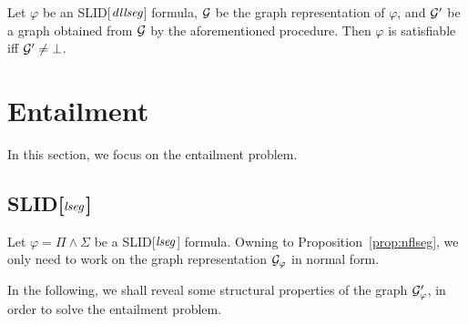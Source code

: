 \documentclass{llncs}
\newcommand{\zhilin}[1]{\color{red} {ZL: #1 :LZ} \color{black}}
\newcommand{\tl}[1]{\color{blue} {TL: #1 :LT} \color{black}}
\begin{document}
\medskip

\begin{lemma}
Let $\varphi$ be an SLID[$\mathit{dllseg}$] formula, $\mathcal{G}$ be the graph representation of $\varphi$, and $\mathcal{G}'$ be a graph obtained from $\mathcal{G}$ by the aforementioned procedure. Then $\varphi$ is satisfiable iff $\mathcal{G}' \neq \bot$.
\end{lemma}


\section{Entailment}

In this section, we focus on the entailment problem.
\subsection{SLID[$\mathit{lseg}$]}


Let $\varphi = \Pi \wedge \Sigma$ be a SLID[$\mathit{lseg}$] formula. Owning to Proposition~\ref{prop:nflseg}, we only need to work on the graph representation $\mathcal{G}_\varphi$ in  normal form.

In the following, we shall reveal some structural properties of the graph $\mathcal{G}'_\varphi$, in order to solve the entailment problem.



%
\end{document}
